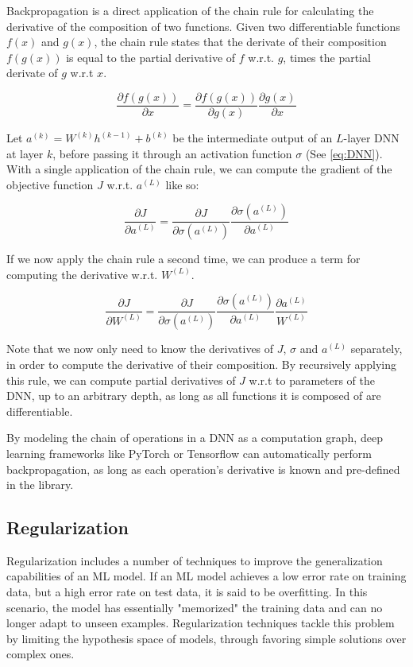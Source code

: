 Backpropagation is a direct application of the chain rule for calculating the derivative of the composition of two functions. Given two differentiable functions $f(x)$ and $g(x)$, the chain rule states that the derivate of their composition $f(g(x))$ is equal to the partial derivative of $f$ w.r.t. $g$, times the partial derivate of $g$ w.r.t $x$.

\begin{equation}
    \frac{\partial f(g(x))}{\partial x} = \frac{\partial f(g(x))}{\partial g(x)} \frac{\partial g(x)}{\partial x}
\end{equation}

Let $a^{(k)} = W^{(k)} h^{(k-1)} + b^{(k)}$ be the intermediate output of an $L$-layer DNN at layer $k$, before passing it through an activation function $\sigma$ (See \ref{eq:DNN}). With a single application of the chain rule, we can compute the gradient of the objective function $J$ w.r.t. $a^{(L)}$ like so:

\begin{equation}
    \frac{\partial J}{\partial a^{(L)}} = \frac{\partial J}{\partial \sigma(a^{(L)})} \frac{\partial \sigma(a^{(L)})}{\partial a^{(L)}}
\end{equation}

If we now apply the chain rule a second time, we can produce a term for computing the derivative w.r.t. $W^{(L)}$.

\begin{equation}
    \frac{\partial J}{\partial W^{(L)}} = \frac{\partial J}{\partial \sigma(a^{(L)})} \frac{\partial \sigma(a^{(L)})}{\partial a^{(L)}} \frac{\partial a^{(L)}}{W^{(L)}}
\end{equation}

Note that we now only need to know the derivatives of $J$, $\sigma$ and $a^{(L)}$ separately, in order to compute the derivative of their composition. By recursively applying this rule, we can compute partial derivatives of $J$ w.r.t to parameters of the DNN, up to an arbitrary depth, as long as all functions it is composed of are differentiable.

By modeling the chain of operations in a DNN as a computation graph, deep learning frameworks like PyTorch \cite{NEURIPS2019_9015} or Tensorflow \cite{tensorflow2015-whitepaper} can automatically perform backpropagation, as long as each operation's derivative is known and pre-defined in the library.

\subsection{Regularization}
Regularization includes a number of techniques to improve the generalization capabilities of an ML model. If an ML model achieves a low error rate on training data, but a high error rate on test data, it is said to be overfitting. In this scenario, the model has essentially "memorized" the training data and can no longer adapt to unseen examples. Regularization techniques tackle this problem by limiting the hypothesis space of models, through favoring simple solutions over complex ones.

